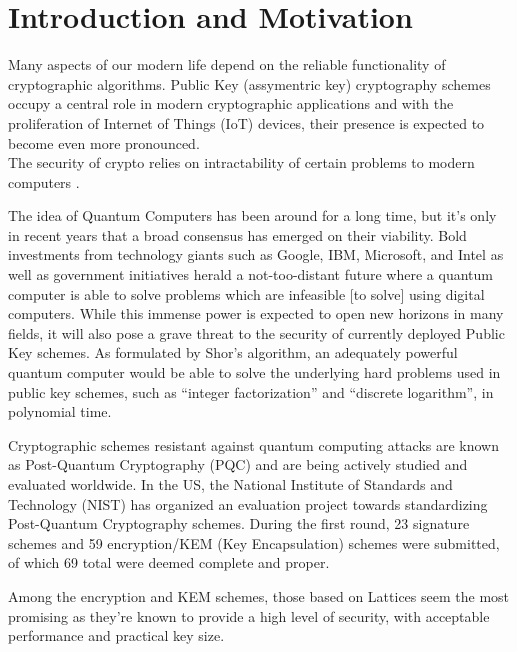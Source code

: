 

\chapter{Introduction and Motivation}

Many aspects of our modern life depend on the reliable functionality of cryptographic algorithms. Public Key (assymentric key) cryptography
 schemes occupy a central role in modern cryptographic applications and with the
 proliferation of Internet of Things (IoT) devices, their presence is expected to become even more pronounced. \\

The security of crypto relies on intractability of certain problems to 
modern computers \cite{moody2017}.

The idea of Quantum Computers has been around for a long time, but it's only in recent years that 
a broad consensus has emerged on their viability.
Bold investments from technology giants such as Google, IBM, Microsoft, and Intel as well as  
 government initiatives herald a not-too-distant future where a quantum computer is able to solve problems
 which are infeasible [to solve] using digital computers. While this immense power is expected to open new horizons in 
 many fields, it will also pose a grave threat to the security of currently deployed Public Key schemes. 
 As formulated by Shor’s algorithm, an adequately powerful quantum computer would be able to solve the underlying hard problems
 used in public key schemes, such as ``integer factorization''
   and ``discrete logarithm'', in polynomial time.


Cryptographic schemes resistant against quantum computing attacks are known as Post-Quantum Cryptography (PQC)
 and are being actively studied and evaluated worldwide. In the US, the National Institute of Standards and 
 Technology (NIST) has organized an evaluation project towards standardizing Post-Quantum
  Cryptography schemes. During the first round, 23 signature schemes and 59
   encryption/KEM (Key Encapsulation) schemes were submitted, of which 69 total were deemed complete and
    proper. 
    
    
  Among the encryption and KEM schemes, those based on Lattices seem the most 
    promising as they're known to provide a high level of security, with acceptable performance
     and practical key size. 

